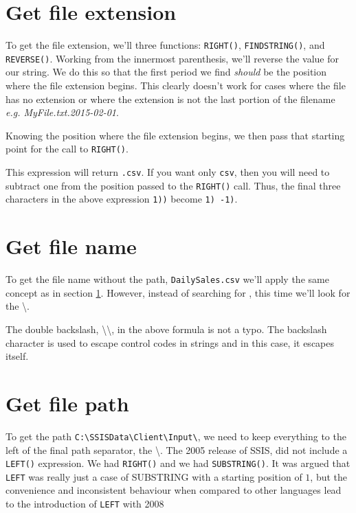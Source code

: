 \section{Get file extension}
\label{sec:Get file extension}
To get the file extension, we'll three functions: \verb|RIGHT()|, \verb|FINDSTRING()|, and \verb|REVERSE()|. Working from the innermost parenthesis, we'll reverse the value for our string. We do this so that the first period we find {\em should} be the position where the file extension begins. This clearly doesn't work for cases where the file has no extension or where the extension is not the last portion of the filename {\em e.g. MyFile.txt.2015-02-01}. 

Knowing the position where the file extension begins, we then pass that starting point for the call to \verb|RIGHT()|.



This expression will return \verb|.csv|. If you want only \verb|csv|, then you will need to subtract one from the position passed to the \verb|RIGHT()| call. Thus, the final three characters in the above expression \verb|1))| become \verb|1) -1)|.


\section{Get file name}
\label{sec:Get file name}
To get the file name without the path, \verb|DailySales.csv| we'll apply the same concept as in section \ref{sec:Get file extension}. However, instead of searching for , this time we'll look for the \textbackslash. 



The double backslash, \textbackslash \textbackslash , in the above formula is not a typo. The backslash character is used to escape control codes in strings and in this case, it escapes itself. 

\section{Get file path}
\label{sec:Get file path}
To get the path \verb|C:\SSISData\Client\Input\|, we need to keep everything to the left of the final path separator, the \textbackslash. The 2005 release of SSIS, did not include a \verb|LEFT()| expression. We had \verb|RIGHT()| and we had \verb|SUBSTRING()|. It was argued that \verb|LEFT| was really just a case of SUBSTRING with a starting position of $1$, but the convenience and inconsistent behaviour when compared to other languages lead to the introduction of \verb|LEFT| with 2008

